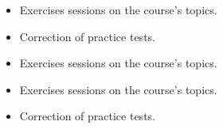 \documentclass[10pt,a4paper]{altacv}
\begin{document}
\begin{itemize}
\item  Exercises sessions on the course's topics.
\item  Correction of practice tests.
\end{itemize}



\begin{itemize}
\item  Exercises sessions on the course's topics.

\end{itemize}






\begin{itemize}
\item  Exercises sessions on the course's topics.
\item  Correction of practice tests.
\end{itemize}














\clearpage
\end{document}
